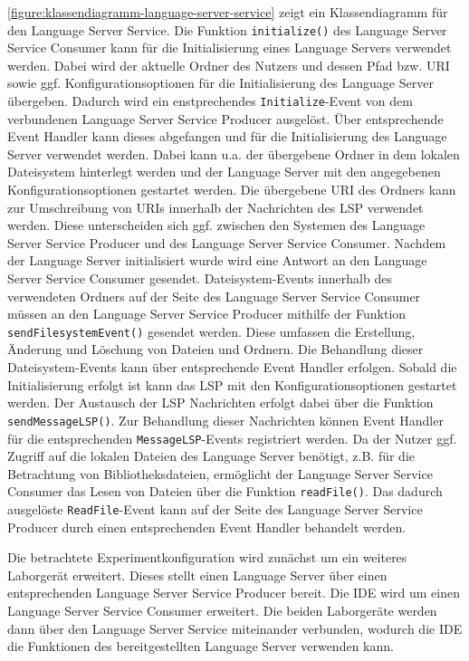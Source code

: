 \autoref{figure:klassendiagramm-language-server-service} zeigt ein Klassendiagramm für den Language Server Service. Die Funktion \texttt{initialize()} des Language Server Service Consumer kann für die Initialisierung eines Language Servers verwendet werden. Dabei wird der aktuelle Ordner des Nutzers und dessen Pfad bzw. URI sowie ggf. Konfigurationsoptionen für die Initialisierung des Language Server übergeben. Dadurch wird ein enstprechendes \texttt{Initialize}-Event von dem verbundenen Language Server Service Producer ausgelöst. Über entsprechende Event Handler kann dieses abgefangen und für die Initialisierung des Language Server verwendet werden. Dabei kann u.a. der übergebene Ordner in dem lokalen Dateisystem hinterlegt werden und der Language Server mit den angegebenen Konfigurationsoptionen gestartet werden. Die übergebene URI des Ordners kann zur Umschreibung von URIs innerhalb der Nachrichten des \ac{LSP} verwendet werden. Diese unterscheiden sich ggf. zwischen den Systemen des Language Server Service Producer und des Language Server Service Consumer. Nachdem der Language Server initialisiert wurde wird eine Antwort an den Language Server Service Consumer gesendet. Dateisystem-Events innerhalb des verwendeten Ordners auf der Seite des Language Server Service Consumer müssen an den Language Server Service Producer mithilfe der Funktion \texttt{sendFilesystemEvent()} gesendet werden. Diese umfassen die Erstellung, Änderung und Löschung von Dateien und Ordnern. Die Behandlung dieser Dateisystem-Events kann über entsprechende Event Handler erfolgen. Sobald die Initialisierung erfolgt ist kann das \ac{LSP} mit den Konfigurationsoptionen gestartet werden. Der Austausch der \ac{LSP} Nachrichten erfolgt dabei über die Funktion \texttt{sendMessageLSP()}. Zur Behandlung dieser Nachrichten können Event Handler für die entsprechenden \texttt{MessageLSP}-Events registriert werden. Da der Nutzer ggf. Zugriff auf die lokalen Dateien des Language Server benötigt, z.B. für die Betrachtung von Bibliotheksdateien, ermöglicht der Language Server Service Consumer das Lesen von Dateien über die Funktion \texttt{readFile()}. Das dadurch ausgelöste \texttt{ReadFile}-Event kann auf der Seite des Language Server Service Producer durch einen entsprechenden Event Handler behandelt werden.

Die betrachtete Experimentkonfiguration wird zunächst um ein weiteres Laborgerät erweitert. Dieses stellt einen Language Server über einen entsprechenden Language Server Service Producer bereit. Die IDE wird um einen Language Server Service Consumer erweitert. Die beiden Laborgeräte werden dann über den Language Server Service miteinander verbunden, wodurch die IDE die Funktionen des bereitgestellten Language Server verwenden kann.